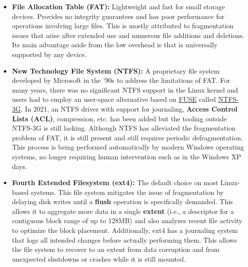 \begin{itemize}
    \item \textbf{File Allocation Table (FAT):} Lightweight and fast for
          small storage devices. Provides no integrity guarantees and has
          poor performance for operations involving large files. This is mostly
          attributed to fragmentation issues that arise after extended use and
          numerous file additions and deletions. Its main advantage aside from
          the low overhead is that is universally supported by any device.

    \item \textbf{New Technology File System (NTFS):} A proprietary file system
          developed by Microsoft in the '90s to address the limitations of FAT.
          For many years, there was no significant NTFS support in the Linux
          kernel and users had to employ an user-space alternative based on
          \href{https://www.kernel.org/doc/html/latest/filesystems/fuse.html}
          {FUSE} called \href{https://wiki.archlinux.org/title/NTFS-3G}{NTFS-3G}.
          In 2021, an NTFS driver with support for journaling, \textbf{Access
          Control Lists (ACL)}, compression, etc. has been added but the tooling
          outside NTFS-3G is still lacking. Although NTFS has alleviated the
          fragmentation problem of FAT, it is still present and still requires
          periodic defragmentation. This process is being performed
          automatically by modern Windows operating systems, no longer requiring
          human intervention such as in the Windows XP days.

    \item \textbf{Fourth Extended Filesystem (ext4):} The default choice on most
          Linux-based systems. This file system mitigates the issue of
          fragmentation by delaying disk writes until a \textbf{flush} operation
          is specifically demanded. This allows it to aggregate more data in a
          single \textbf{extent} (i.e., a descriptor for a contiguous block
          range of up to 128MB) and also analyzes recent file activity to
          optimize the block placement. Additionally, ext4 has a journaling
          system that logs all intended changes before actually performing them.
          This allows the file system to recover to an extent from data
          corruption and from unexpected shutdowns or crashes while it is
          still mounted.


\end{itemize}
